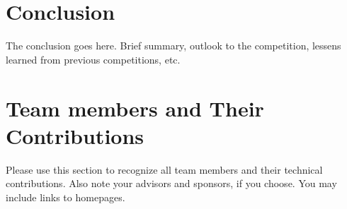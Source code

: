 \documentclass[journal]{IEEEtran}
\begin{document}




\section{Conclusion}
The conclusion goes here. Brief summary, outlook to the competition, lessens learned from previous competitions, etc.






%


\appendices

\section{Team members and Their Contributions}
Please use this section to recognize all team members and their technical contributions.  Also note your advisors and sponsors, if you choose. You may include links to homepages.
\end{document}

